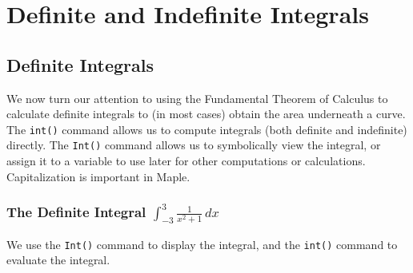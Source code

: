\chapter{Definite and Indefinite Integrals}
\label{chp:definite_and_indefinite_Integrals}	

\section{Definite Integrals}
\label{sec:definite_integrals}

We now turn our attention to using the Fundamental Theorem of Calculus to calculate definite integrals to (in most cases) obtain the area underneath a curve.\\

The \texttt{int()} command allows us to compute integrals (both definite and indefinite) directly. The \texttt{Int()} command allows us to symbolically view the integral, or assign it to a variable to use later for other computations or calculations. Capitalization is important in Maple.

\subsection{The Definite Integral $\displaystyle\int_{-3}^{3}\frac{1}{x^2+1}\, dx$}

\begin{maplegroup}
\begin{mapleinput}
\end{mapleinput}
\mapleresult
\begin{maplelatex}
\end{maplelatex}
\end{maplegroup}
\begin{maplegroup}
\begin{mapleinput}
\end{mapleinput}
\mapleresult
{}
\end{maplegroup}


We use the \texttt{Int()} command to display the integral, and the \texttt{int()} command to evaluate the integral.

